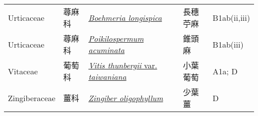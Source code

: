 {\begin{longtable}{p{2.5cm}p{2.5cm}p{4.5cm}p{2.5cm}p{3cm}}
    Urticaceae & 蕁麻科 & \href{http://www.theplantlist.org/tpl1.1/search?q=Boehmeria+longispica}{\textit{Boehmeria longispica} } & 長穗苧麻 & B1ab(ii,iii) \index{Boehmeria@\textit{Boehmeria}!longispica@\textit{longispica}}  \index{長穗苧麻} \\
    Urticaceae & 蕁麻科 & \href{http://www.theplantlist.org/tpl1.1/search?q=Poikilospermum+acuminata}{\textit{Poikilospermum acuminata} } & 錐頭麻 & B1ab(iii) \index{Poikilospermum@\textit{Poikilospermum}!acuminata@\textit{acuminata}}  \index{錐頭麻} \\
    Vitaceae & 葡萄科 & \href{http://www.theplantlist.org/tpl1.1/search?q=Vitis+thunbergii+var.+taiwaniana}{\textit{Vitis thunbergii} var. \textit{taiwaniana} } & 小葉葡萄 & A1a; D \index{Vitis@\textit{Vitis}!thunbergii@\textit{thunbergii}!var. taiwaniana@var. \textit{taiwaniana}}  \index{小葉葡萄} \\
    Zingiberaceae & 薑科 & \href{http://www.theplantlist.org/tpl1.1/search?q=Zingiber+oligophyllum}{\textit{Zingiber oligophyllum} } & 少葉薑 & D \index{Zingiber@\textit{Zingiber}!oligophyllum@\textit{oligophyllum}}  \index{少葉薑} \\
    \bottomrule
        \end{longtable}
        }
    